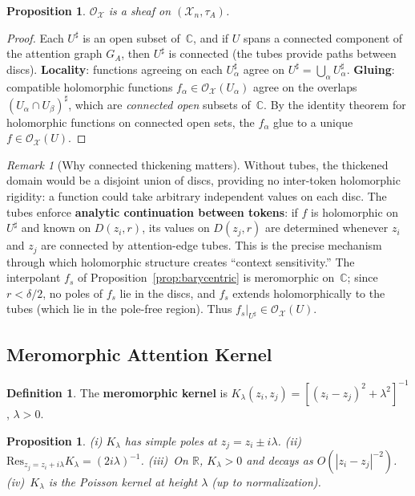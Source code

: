 \documentclass[11pt,a4paper]{article}
\theoremstyle{plain}
\newtheorem{proposition}[theorem]{Proposition}
\theoremstyle{definition}
\newtheorem{definition}[theorem]{Definition}
\theoremstyle{remark}
\newtheorem{remark}[theorem]{Remark}
\newcommand{\R}{\mathbb{R}}
\newcommand{\C}{\mathbb{C}}
\newcommand{\cO}{\mathcal{O}}
\newcommand{\cX}{\mathcal{X}}
\newcommand{\Res}{\mathrm{Res}}
\begin{document}
\begin{proposition}\label{prop:hol-is-sheaf}
$\cO_\cX$ is a sheaf on $(\cX_n, \tau_A)$.
\end{proposition}

\begin{proof}
Each $U^\sharp$ is an open subset of~$\C$, and if $U$ spans a connected component of the attention graph $G_A$, then $U^\sharp$ is connected (the tubes provide paths between discs). \textbf{Locality}: functions agreeing on each $U_\alpha^\sharp$ agree on $U^\sharp = \bigcup_\alpha U_\alpha^\sharp$. \textbf{Gluing}: compatible holomorphic functions $f_\alpha \in \cO_\cX(U_\alpha)$ agree on the overlaps $(U_\alpha \cap U_\beta)^\sharp$, which are \emph{connected open} subsets of~$\C$. By the identity theorem for holomorphic functions on connected open sets, the $f_\alpha$ glue to a unique $f \in \cO_\cX(U)$.
\end{proof}

\begin{remark}[Why connected thickening matters]\label{rem:thickening}
Without tubes, the thickened domain would be a disjoint union of discs, providing no inter-token holomorphic rigidity: a function could take arbitrary independent values on each disc. The tubes enforce \textbf{analytic continuation between tokens}: if $f$ is holomorphic on $U^\sharp$ and known on $D(z_i, r)$, its values on $D(z_j, r)$ are determined whenever $z_i$ and $z_j$ are connected by attention-edge tubes. This is the precise mechanism through which holomorphic structure creates ``context sensitivity.'' The interpolant $f_s$ of Proposition~\ref{prop:barycentric} is meromorphic on~$\C$; since $r < \delta/2$, no poles of $f_s$ lie in the discs, and $f_s$ extends holomorphically to the tubes (which lie in the pole-free region). Thus $f_s|_{U^\sharp} \in \cO_\cX(U)$.
\end{remark}

\subsection{Meromorphic Attention Kernel}

\begin{definition}\label{def:kernel}
The \textbf{meromorphic kernel} is $K_\lambda(z_i, z_j) = [(z_i - z_j)^2 + \lambda^2]^{-1}$, $\lambda > 0$.
\end{definition}

\begin{proposition}\label{prop:kernel}
(i) $K_\lambda$ has simple poles at $z_j = z_i \pm i\lambda$. (ii)~$\Res_{z_j = z_i + i\lambda} K_\lambda = (2i\lambda)^{-1}$. (iii)~On $\R$, $K_\lambda > 0$ and decays as $O(|z_i - z_j|^{-2})$. (iv)~$K_\lambda$ is the Poisson kernel at height $\lambda$ (up to normalization).
\end{proposition}
\end{document}
